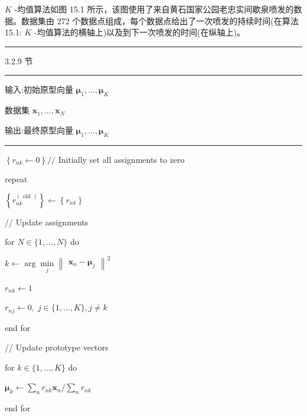 \documentclass[10pt]{report}
\newcommand{\HRule}{\begin{center}\rule{0.9\linewidth}{0.2mm}\end{center}}
\begin{document}
\(K\) -均值算法如图 15.1 所示，该图使用了来自黄石国家公园老忠实间歇泉喷发的数据。数据集由 272 个数据点组成，每个数据点给出了一次喷发的持续时间(在算法 15.1: \(K\) -均值算法的横轴上)以及到下一次喷发的时间(在纵轴上)。

\HRule

3.2.9 节

\HRule

输入:初始原型向量 \({\mathbf{\mu }}_{1},\ldots ,{\mathbf{\mu }}_{K}\)

数据集 \({\mathbf{x}}_{1},\ldots ,{\mathbf{x}}_{N}\)

输出:最终原型向量 \({\mathbf{\mu }}_{1},\ldots ,{\mathbf{\mu }}_{K}\)

\HRule

\(\left\{  {{r}_{nk} \leftarrow  0}\right\}  //\) Initially set all assignments to zero

repeat

\hspace*{1em} \(\left\{  {r}_{nk}^{\left( \text{ old }\right) }\right\}   \leftarrow  \left\{  {r}_{nk}\right\}\)

\hspace*{1em} // Update assignments

\hspace*{1em} for \(N \in  \{ 1,\ldots ,N\}\) do

\hspace*{2em} \(k \leftarrow  \arg \mathop{\min }\limits_{j}{\begin{Vmatrix}{\mathbf{x}}_{n} - {\mathbf{\mu }}_{j}\end{Vmatrix}}^{2}\)

\hspace*{3em} \({r}_{nk} \leftarrow  1\)

\hspace*{2em} \({r}_{nj} \leftarrow  0,\;j \in  \{ 1,\ldots ,K\} ,j \neq  k\)

\hspace*{1em} end for

\hspace*{1em} // Update prototype vectors

\hspace*{1em} for \(k \in  \{ 1,\ldots ,K\}\) do

\hspace*{2em} \({\mathbf{\mu }}_{k} \leftarrow  \mathop{\sum }\limits_{n}{r}_{nk}{\mathbf{x}}_{n}/\mathop{\sum }\limits_{n}{r}_{nk}\)

\hspace*{1em} end for
\end{document}
